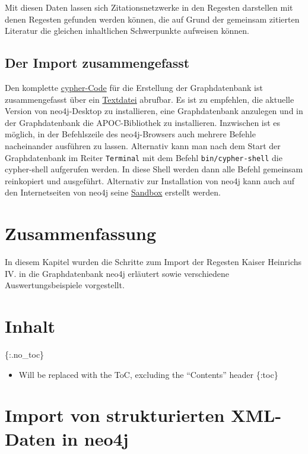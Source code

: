 \documentclass[ngerman,]{scrreprt}
\providecommand{\tightlist}{%
  \setlength{\itemsep}{0pt}\setlength{\parskip}{0pt}}
\begin{document}
Mit diesen Daten lassen sich Zitationsnetzwerke in den Regesten darstellen mit denen Regesten gefunden werden können, die auf Grund der gemeinsam zitierten Literatur die gleichen inhaltlichen Schwerpunkte aufweisen können.

\section{Der Import zusammengefasst}\label{der-import-zusammengefasst}

Den komplette \href{cypher/20_cypher-Datenbankerstellung.txt}{cypher-Code} für die Erstellung der Graphdatenbank ist zusammengefasst über ein \href{cypher/20_cypher-Datenbankerstellung.txt}{Textdatei} abrufbar. Es ist zu empfehlen, die aktuelle Version von neo4j-Desktop zu installieren, eine Graphdatenbank anzulegen und in der Graphdatenbank die APOC-Bibliothek zu installieren. Inzwischen ist es möglich, in der Befehlszeile des neo4j-Browsers auch mehrere Befehle nacheinander ausführen zu lassen. Alternativ kann man nach dem Start der Graphdatenbank im Reiter \texttt{Terminal} mit dem Befehl \texttt{bin/cypher-shell} die cypher-shell aufgerufen werden. In diese Shell werden dann alle Befehl gemeinsam reinkopiert und ausgeführt. Alternativ zur Installation von neo4j kann auch auf den Internetseiten von neo4j seine \href{https://neo4j.com/lp/try-neo4j-sandbox}{Sandbox} erstellt werden.

\chapter{Zusammenfassung}\label{zusammenfassung-1}

In diesem Kapitel wurden die Schritte zum Import der Regesten Kaiser Heinrichs IV. in die Graphdatenbank neo4j erläutert sowie verschiedene Auswertungsbeispiele vorgestellt.

\chapter{Inhalt}\label{inhalt-3}

\{:.no\_toc\}

\begin{itemize}
\tightlist
\item
  Will be replaced with the ToC, excluding the ``Contents'' header \{:toc\}
\end{itemize}

\chapter{Import von strukturierten XML-Daten in neo4j}\label{import-von-strukturierten-xml-daten-in-neo4j}
\end{document}
